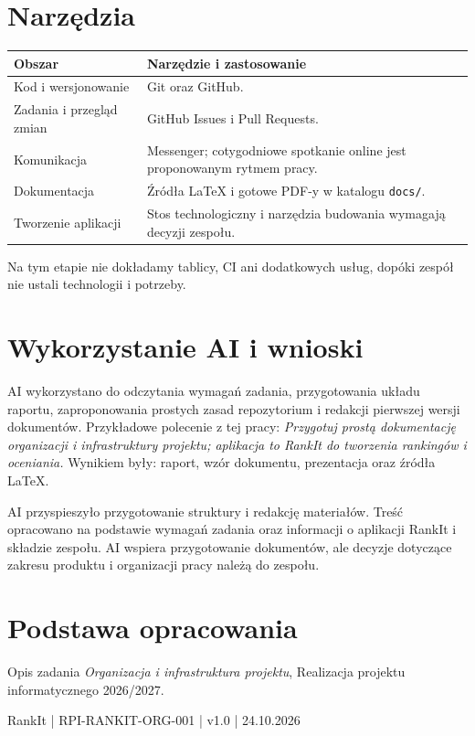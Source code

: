\documentclass[11pt,a4paper]{article}
\begin{document}
\section{Narzędzia}
\begin{tabularx}{\textwidth}{p{}L}
  \toprule
  \textbf{Obszar} & \textbf{Narzędzie i zastosowanie} \\
  \midrule
  Kod i wersjonowanie & Git oraz GitHub. \\
  Zadania i przegląd zmian & GitHub Issues i Pull Requests. \\
  Komunikacja & Messenger; cotygodniowe spotkanie online jest proponowanym rytmem pracy. \\
  Dokumentacja & Źródła LaTeX i gotowe PDF-y w katalogu \texttt{docs/}. \\
  Tworzenie aplikacji & Stos technologiczny i narzędzia budowania wymagają decyzji zespołu. \\
  \bottomrule
\end{tabularx}

Na tym etapie nie dokładamy tablicy, CI ani dodatkowych usług, dopóki zespół nie ustali technologii i potrzeby.

\section{Wykorzystanie AI i wnioski}
AI wykorzystano do odczytania wymagań zadania, przygotowania układu raportu, zaproponowania prostych zasad repozytorium i redakcji pierwszej wersji dokumentów. Przykładowe polecenie z tej pracy: \emph{Przygotuj prostą dokumentację organizacji i infrastruktury projektu; aplikacja to RankIt do tworzenia rankingów i oceniania.} Wynikiem były: raport, wzór dokumentu, prezentacja oraz źródła LaTeX.

AI przyspieszyło przygotowanie struktury i redakcję materiałów. Treść opracowano na podstawie wymagań zadania oraz informacji o aplikacji RankIt i składzie zespołu. AI wspiera przygotowanie dokumentów, ale decyzje dotyczące zakresu produktu i organizacji pracy należą do zespołu.

\section*{Podstawa opracowania}
Opis zadania \emph{Organizacja i infrastruktura projektu}, Realizacja projektu informatycznego 2026/2027.

\vfill
\begin{center}\small RankIt | RPI-RANKIT-ORG-001 | v1.0 | 24.10.2026\end{center}
\end{document}
